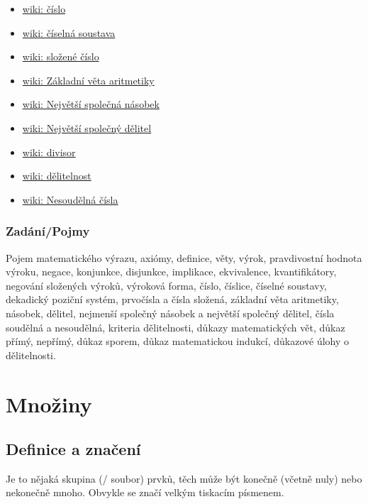 \documentclass[12pt]{article}
\begin{document}
\begin{itemize}
\item \href{https://cs.wikipedia.org/wiki/\%C4\%8C\%C3\%ADslo}{wiki: číslo}
\item \href{https://cs.wikipedia.org/wiki/\%C4\%8C\%C3\%ADseln\%C3\%A1_soustava}{wiki: číselná soustava}
\item \href{https://cs.wikipedia.org/wiki/Slo\%C5\%BEen\%C3\%A9_\%C4\%8D\%C3\%ADslo}{wiki: složené číslo}
\item \href{https://cs.wikipedia.org/wiki/Z\%C3\%A1kladn\%C3\%AD_v\%C4\%9Bta_aritmetiky}{wiki: Základní věta aritmetiky}
\item \href{https://cs.wikipedia.org/wiki/Nejmen\%C5\%A1\%C3\%AD_spole\%C4\%8Dn\%C3\%BD_n\%C3\%A1sobek}{wiki: Největší společná násobek}
\item \href{https://cs.wikipedia.org/wiki/Nejv\%C4\%9Bt\%C5\%A1\%C3\%AD_spole\%C4\%8Dn\%C3\%BD_d\%C4\%9Blitel}{wiki: Největší společný dělitel}
\item \href{https://en.wikipedia.org/wiki/Divisor}{wiki: divisor}
\item \href{https://cs.wikipedia.org/wiki/D\%C4\%9Blitelnost}{wiki: dělitelnost}
\item \href{https://cs.wikipedia.org/wiki/Nesoud\%C4\%9Bln\%C3\%A1_\%C4\%8D\%C3\%ADsla}{wiki: Nesoudělná čísla}
\end{itemize}
\subsubsection{Zadání/Pojmy}
Pojem matematického výrazu, axiómy, definice, věty, výrok, pravdivostní hodnota výroku, negace, konjunkce, disjunkce, implikace, ekvivalence, kvantifikátory, negování složených výroků, výroková forma, číslo, číslice, číselné soustavy, dekadický poziční systém, prvočísla a čísla složená, základní věta aritmetiky, násobek, dělitel, nejmenší společný násobek a největší společný dělitel, čísla soudělná a nesoudělná, kriteria dělitelnosti, důkazy matematických vět, důkaz přímý, nepřímý, důkaz sporem, důkaz matematickou indukcí, důkazové úlohy o dělitelnosti.

\section{Množiny}
\subsection{Definice a značení}
Je to nějaká skupina (/ soubor) prvků, těch může být konečně (včetně  nuly) nebo nekonečně mnoho. Obvykle se značí velkým tiskacím písmenem.
\end{document}

